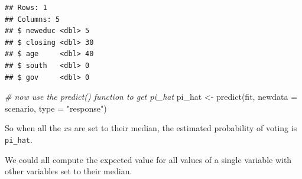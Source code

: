 \documentclass[
]{book}
\newenvironment{Shaded}{\begin{snugshade}}{\end{snugshade}}
\newcommand{\AttributeTok}[1]{\textcolor[rgb]{0.77,0.63,0.00}{#1}}
\newcommand{\CommentTok}[1]{\textcolor[rgb]{0.56,0.35,0.01}{\textit{#1}}}
\newcommand{\FunctionTok}[1]{\textcolor[rgb]{0.00,0.00,0.00}{#1}}
\newcommand{\NormalTok}[1]{#1}
\newcommand{\OtherTok}[1]{\textcolor[rgb]{0.56,0.35,0.01}{#1}}
\newcommand{\SpecialCharTok}[1]{\textcolor[rgb]{0.00,0.00,0.00}{#1}}
\newcommand{\StringTok}[1]{\textcolor[rgb]{0.31,0.60,0.02}{#1}}
\begin{document}
\begin{Shaded}
\end{Shaded}

\begin{verbatim}
## Rows: 1
## Columns: 5
## $ neweduc <dbl> 5
## $ closing <dbl> 30
## $ age     <dbl> 40
## $ south   <dbl> 0
## $ gov     <dbl> 0
\end{verbatim}

\begin{Shaded}
\begin{Highlighting}[]
\CommentTok{\# now use the predict() function to get pi\_hat}
\NormalTok{pi\_hat }\OtherTok{\textless{}{-}} \FunctionTok{predict}\NormalTok{(fit, }\AttributeTok{newdata =}\NormalTok{ scenario, }\AttributeTok{type =} \StringTok{"response"}\NormalTok{)}
\end{Highlighting}
\end{Shaded}

So when all the \(x\)s are set to their median, the estimated probability of voting is \texttt{pi\_hat}.

We could all compute the expected value for all values of a single variable with other variables set to their median.

\begin{Shaded}
\end{Shaded}
\end{document}
